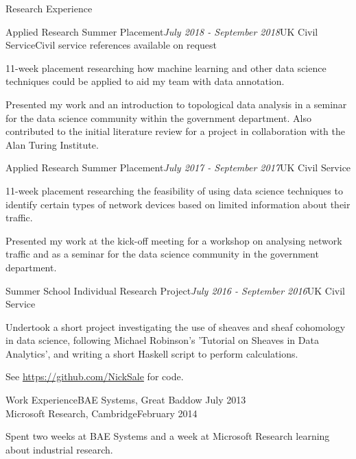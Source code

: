\documentclass{resume} %
\begin{document}
\begin{rSection}{Research Experience}
	
\begin{rSubsection}{Applied Research Summer Placement}{\em July 2018 - September 2018}{UK Civil Service}{Civil service references available on request}
	\item 11-week placement researching how machine learning and other data science techniques could be applied to aid my team with data annotation.
	\item Presented my work and an introduction to topological data analysis in a seminar for the data science community within the government department. Also contributed to the initial literature review for a project in collaboration with the Alan Turing Institute.
\end{rSubsection}


\begin{rSubsection}{Applied Research Summer Placement}{\em July 2017 - September 2017}{UK Civil Service}{}
	\item 11-week placement researching the feasibility of using data science techniques to identify certain types of network devices based on limited information about their traffic.
	\item Presented my work at the kick-off meeting for a workshop on analysing network traffic and as a seminar for the data science community in the government department.
\end{rSubsection}


\begin{rSubsection}{Summer School Individual Research Project}{\em July 2016 - September 2016}{UK Civil Service}{}
	\item Undertook a short project investigating the use of sheaves and sheaf cohomology in data science, following Michael Robinson's 'Tutorial on Sheaves in Data Analytics', and writing a short Haskell script to perform calculations.
	\item See \url{https://github.com/NickSale} for code.
\end{rSubsection}



\begin{rSubsection}{Work Experience}{}{BAE Systems, Great Baddow \hfill July 2013 \\ Microsoft Research, Cambridge}{February 2014}
	\item Spent two weeks at BAE Systems and a week at Microsoft Research learning about industrial research.
\end{rSubsection}

\end{rSection}
\end{document}

